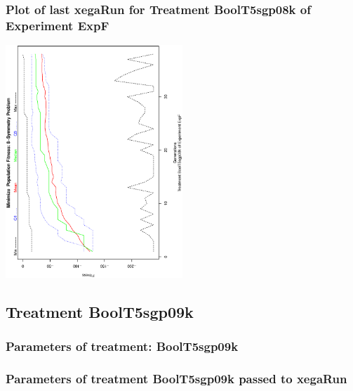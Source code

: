 \documentclass[18pt,c]{beamer}
\makeatletter
\def\beamer@writeslidentry@miniframesoff{%
  \expandafter\beamer@ifempty\expandafter{\beamer@framestartpage}{}%
  {%
   \clearpage\beamer@notesactions%
  }
}
\newcommand*{\miniframesoff}{\let\beamer@writeslidentry=\beamer@writeslidentry@miniframesoff}
\makeatother
\begin{document}
 \begin{frame}
 \frametitle{ Plot of last xegaRun for Treatment BoolT5sgp08k of Experiment ExpF }
 \begin{center}
\includegraphics[width=0.5\textwidth, angle=-90]
{ExpFPlotPopStatsFigure006.eps}
 \end{center}
 \label{report/ExpFPlotPopStatsFigure006.eps}  
 \end{frame}

\miniframesoff
\subsection{Treatment BoolT5sgp09k}

 \begin{frame}
 \fontsize{8pt}{9pt}\selectfont
 \frametitle{  Parameters of treatment: BoolT5sgp09k 
 }

 \label{ExpFtParmTable028.tex}  
 \end{frame}


 \begin{frame}
 \fontsize{8pt}{9pt}\selectfont
 \frametitle{  Parameters of treatment BoolT5sgp09k passed to xegaRun
 }

 \label{ExpFtParmTable029.tex}  
 \end{frame}
\end{document}
